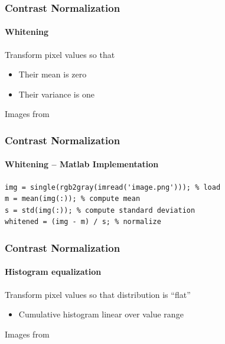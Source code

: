 \documentclass[xetex,professionalfont]{beamer}
\begin{document}
\begin{frame}
\frametitle{Contrast Normalization}
\framesubtitle{Whitening}

Transform pixel values so that
\begin{itemize}
	\item Their mean is zero
	\item Their variance is one %
\end{itemize}

\medskip
\begin{center}
	{\centering Images from \cite{prince12}}
\end{center}

\end{frame}


\begin{frame}[fragile]
\frametitle{Contrast Normalization}
\framesubtitle{Whitening -- Matlab Implementation}

\begin{verbatim}
img = single(rgb2gray(imread('image.png'))); % load
m = mean(img(:)); % compute mean
s = std(img(:)); % compute standard deviation
whitened = (img - m) / s; % normalize
\end{verbatim}

\end{frame}


\begin{frame}
\frametitle{Contrast Normalization}
\framesubtitle{Histogram equalization}

Transform pixel values so that distribution is \enquote{flat} %
\begin{itemize}
	\item Cumulative histogram linear over value range %
\end{itemize}

\medskip
\begin{center}
	{\centering Images from \cite{prince12}}
\end{center}

\end{frame}
\end{document}
